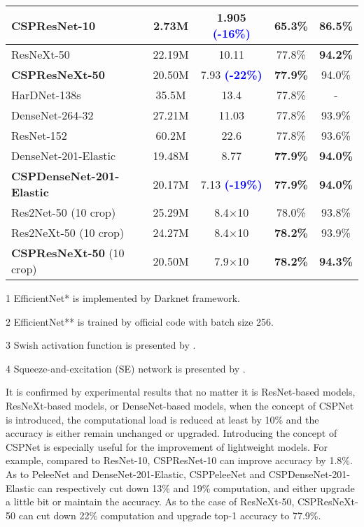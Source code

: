 \documentclass{article}
\begin{document}
\begin{table}[h]
\begin{threeparttable}[h]
\begin{tabular}{lcccc}
			\textbf{CSPResNet-10} & 2.73M & 1.905 \textbf{\textcolor{blue}{(-16\%)}} & \textbf{65.3\%} & \textbf{86.5\%} \\
			\midrule
			ResNeXt-50 \cite{xie2017aggregated} & 22.19M & 10.11 & 77.8\%  & \textbf{94.2\%} \\
			\textbf{CSPResNeXt-50} & 20.50M & 7.93 \textbf{\textcolor{blue}{(-22\%)}} & \textbf{77.9\%} & 94.0\% \\
			HarDNet-138s \cite{chao2019hardnet} & 35.5M & 13.4 & 77.8\% & - \\
			DenseNet-264-32 \cite{huang2017densely} & 27.21M & 11.03 & 77.8\% & 93.9\% \\
			ResNet-152 \cite{he2016deep} & 60.2M & 22.6 & 77.8\% & 93.6\% \\
			\midrule
			DenseNet-201-Elastic \cite{wang2019elastic} & 19.48M & 8.77 &  \textbf{77.9\%} &  \textbf{94.0\%} \\
			\textbf{CSPDenseNet-201-Elastic} & 20.17M & 7.13 \textbf{\textcolor{blue}{(-19\%)}} & \textbf{77.9\%} & \textbf{94.0\%} \\
			\midrule
			Res2Net-50 (10 crop) \cite{gao2019res2net} & 25.29M & 8.4$\times$10 & 78.0\% & 93.8\% \\
			Res2NeXt-50 (10 crop) \cite{gao2019res2net} & 24.27M & 8.4$\times$10 & \textbf{78.2\%} & 93.9\% \\
			\textbf{CSPResNeXt-50} (10 crop) & 20.50M & 7.9$\times$10 & \textbf{78.2\%} & \textbf{94.3\%} \\
			\bottomrule
		\end{tabular}
		\begin{tablenotes}[flushleft]
			\footnotesize
			\item[1] EfficientNet* is implemented by Darknet framework.
			\item[2] EfficientNet** is trained by official code with batch size 256.
			\item[3] Swish activation function is presented by \cite{elfwing2018sigmoid, ramachandran2017searching}.
			\item[4] Squeeze-and-excitation (SE) network is presented by \cite{hu2018squeeze}.
		\end{tablenotes}
	\end{threeparttable}
\end{table}

It is confirmed by experimental results that no matter it is ResNet-based models, ResNeXt-based models, or DenseNet-based models, when the concept of CSPNet is introduced, the computational load is reduced at least by 10\% and the accuracy is either remain unchanged or upgraded.  Introducing the concept of CSPNet is especially useful for the improvement of lightweight models.  For example, compared to ResNet-10, CSPResNet-10 can improve accuracy by 1.8\%.  As to PeleeNet and DenseNet-201-Elastic, CSPPeleeNet and CSPDenseNet-201-Elastic can respectively cut down 13\% and 19\% computation, and either upgrade a little bit or maintain the accuracy.  As to the case of ResNeXt-50, CSPResNeXt-50 can cut down 22\% computation and upgrade top-1 accuracy to 77.9\%.
\end{document}
